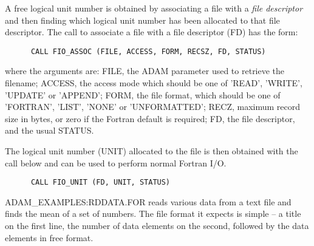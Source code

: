 A free logical unit number is obtained by associating a file with a {\sl file
descriptor\/} and then finding which logical unit number has been allocated to 
that file descriptor.
The call to associate a file with a file descriptor (FD) has the form:
\begin{verbatim}
      CALL FIO_ASSOC (FILE, ACCESS, FORM, RECSZ, FD, STATUS)
\end{verbatim}
where the arguments are: FILE, the ADAM parameter used to retrieve the 
filename; ACCESS, the access mode which should be one 
of 'READ', 'WRITE', 'UPDATE' or 'APPEND';
FORM, the file format, which should be one of 'FORTRAN', 'LIST', 'NONE'
or 'UNFORMATTED';
RECZ, maximum record size in bytes, or zero if the Fortran default is required;
FD, the file descriptor, and the usual STATUS.

The logical unit number (UNIT) allocated to the file is then obtained with the 
call below and can be used to perform normal Fortran I/O.
\begin{verbatim}
      CALL FIO_UNIT (FD, UNIT, STATUS)      
\end{verbatim}

ADAM\_EXAMPLES:RDDATA.FOR reads various data from a text file and finds the 
mean of a set of numbers.
The file format it expects is simple -- a title on the 
first line, the number of data elements on the second, followed by the
data elements in free format.

